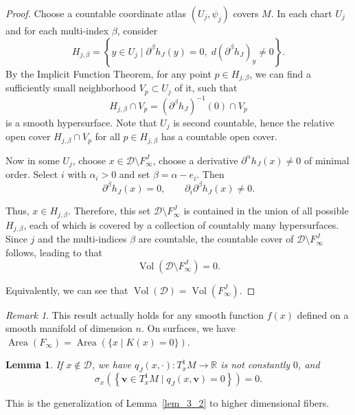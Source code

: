 \documentclass[reqno,11pt]{article}
\newtheorem{lemma}{Lemma}[section]
\theoremstyle{definition}
\theoremstyle{remark}
\newtheorem*{remark}{Remark}
\numberwithin{equation}{section}
\DeclareMathOperator{\area}{Area}
\DeclareMathOperator{\vol}{Vol}
\begin{document}
\begin{proof}
	Choose a countable coordinate atlas $(U_{j},\psi_{j})$ covers $M$. In each chart $U_{j}$ and for each multi-index $\beta$, consider
	\begin{displaymath}
		H_{j,\beta}=\left\{y\in U_{j}\mid \partial^\beta h_J(y)=0,\; d{(\partial^\beta h_J)}_y\ne0\right\}.
	\end{displaymath}
	By the Implicit Function Theorem, for any point $p\in H_{j,\beta}$, we can find a sufficiently small neighborhood $V_{p}\subset U_{j}$ of it, such that
	\begin{displaymath}
		H_{j,\beta}\cap V_{p}={(\partial^{\beta}h_{J})}^{-1}(0) \cap V_{p}
	\end{displaymath}
	is a smooth hypersurface. Note that $U_j$ is second countable, hence the relative open cover $H_{j,\beta}\cap V_{p}$ for all $p\in H_{j,\beta}$ has a countable open cover.

	Now in some $U_{j}$, choose $x\in \mathcal{D}\setminus F_\infty^J$, choose a derivative $\partial^{\alpha} h_J(x)\ne0$ of minimal order. Select $i$ with $\alpha_{i}>0$ and set $\beta=\alpha-e_{i}$. Then
	\begin{displaymath}
		\partial^\beta h_J(x)=0,\qquad \partial_{i}\partial^{\beta} h_J(x)\ne0.
	\end{displaymath}

	Thus, $x\in H_{j,\beta}$. Therefore, this set $\mathcal{D}\setminus F^{J}_{\infty}$ is contained in the union of all possible $H_{j,\beta}$, each of which is covered by a collection of countably many hypersurfaces. Since $j$ and the multi-indices $\beta$ are countable, the countable cover of $\mathcal{D}\setminus F^{J}_{\infty}$ follows, leading to that
	\begin{displaymath}
		\vol(\mathcal{D}\setminus F^{J}_{\infty})=0.
	\end{displaymath}

	Equivalently, we can see that $\vol(\mathcal{D})=\vol(F^{J}_{\infty})$.
\end{proof}

\begin{remark}
	This result actually holds for any smooth function $f(x)$ defined on a smooth manifold of dimension $n$. On surfaces, we have $\area(F_{\infty})=\area (\{x\mid K(x)=0\})$.
\end{remark}

\begin{lemma}\label{lem_5_3}
	If $x\notin \mathcal{D}$, we have $q_J(x,\cdot):T^{1}_{x}M\to\mathbb{R}$ is not constantly $0$, and
	\begin{displaymath}
		\sigma_{x}\left( \left\{\bm{v}\in T^{1}_{x}M\mid q_{J}(x,\bm{v})=0\right\} \right)=0.
	\end{displaymath}
\end{lemma}
This is the generalization of Lemma~\ref{lem_3_2} to higher dimensional fibers.
\end{document}

